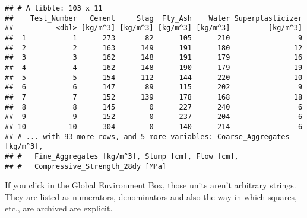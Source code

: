 \documentclass[]{article}
\newenvironment{Shaded}{\begin{snugshade}}{\end{snugshade}}
\newcommand{\DataTypeTok}[1]{\textcolor[rgb]{0.13,0.29,0.53}{#1}}
\newcommand{\KeywordTok}[1]{\textcolor[rgb]{0.13,0.29,0.53}{\textbf{#1}}}
\newcommand{\NormalTok}[1]{#1}
\newcommand{\OperatorTok}[1]{\textcolor[rgb]{0.81,0.36,0.00}{\textbf{#1}}}
\newcommand{\StringTok}[1]{\textcolor[rgb]{0.31,0.60,0.02}{#1}}
\begin{document}
\begin{Shaded}
\end{Shaded}

\begin{verbatim}
## # A tibble: 103 x 11
##    Test_Number   Cement     Slag  Fly_Ash    Water Superplasticizer
##          <dbl> [kg/m^3] [kg/m^3] [kg/m^3] [kg/m^3]         [kg/m^3]
##  1           1      273       82      105      210                9
##  2           2      163      149      191      180               12
##  3           3      162      148      191      179               16
##  4           4      162      148      190      179               19
##  5           5      154      112      144      220               10
##  6           6      147       89      115      202                9
##  7           7      152      139      178      168               18
##  8           8      145        0      227      240                6
##  9           9      152        0      237      204                6
## 10          10      304        0      140      214                6
## # ... with 93 more rows, and 5 more variables: Coarse_Aggregates [kg/m^3],
## #   Fine_Aggregates [kg/m^3], Slump [cm], Flow [cm],
## #   Compressive_Strength_28dy [MPa]
\end{verbatim}

If you click in the Global Environment Box, those units aren't arbitrary
strings. They are listed as numerators, denominators and also the way in
which squares, etc., are archived are explicit.
\end{document}

